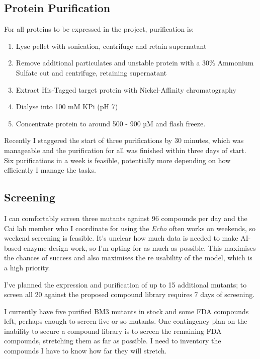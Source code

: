 \documentclass{article}
\begin{document}
\subsection{Protein Purification}
For all proteins to be expressed in the project, purification is:
\begin{enumerate}
	\item Lyse pellet with sonication, centrifuge and retain supernatant
	\item Remove additional particulates and unstable protein with a 30\% Ammonium Sulfate cut and centrifuge, retaining supernatant
	\item Extract His-Tagged target protein with Nickel-Affinity chromatography
	\item Dialyse into 100 mM KPi (pH 7)
	\item Concentrate protein to around 500 - 900 µM and flash freeze.
\end{enumerate}
Recently I staggered the start of three purifications by 30 minutes, which was manageable and the purification for all was finished within three days of start. Six purifications in a week is feasible, potentially more depending on how efficiently I manage the tasks. 
\par

\subsection{Screening}
I can comfortably screen three mutants against 96 compounds per day and the Cai lab member who I coordinate for using the \textit{Echo} often works on weekends, so weekend screening is feasible. It's unclear how much data is needed to make AI-based enzyme design work, so I'm opting for as much as possible. This maximises the chances of success and also maximises the re usability of the model, which is a high priority.
\par
I've planned the expression and purification of up to 15 additional mutants; to screen all 20 against the proposed compound library requires 7 days of screening. 
\par
I currently have five purified BM3 mutants in stock and some FDA compounds left, perhaps enough to screen five or so mutants. One contingency plan on the inability to secure a compound library is to screen the remaining FDA compounds, stretching them as far as possible. I need to inventory the compounds I have to know how far they will stretch. %
\par
\end{document}
